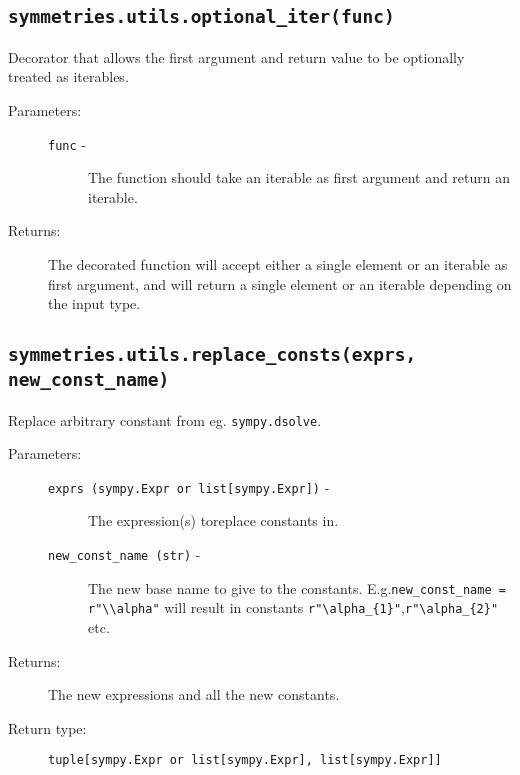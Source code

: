 \subsection*{\lstinline{symmetries.utils.optional_iter(func)}}

   Decorator that allows the first argument and return value to be
   optionally treated as iterables.

   \begin{description}
      \item[Parameters:] \leavevmode
        \begin{description}
            \item[\lstinline{func} -] The function should take an iterable as first argument and return an iterable.
        \end{description}
      \item[Returns:] The decorated function will accept either a single element or an iterable as first argument, and will return a single element or an iterable depending on the input type.
   \end{description}

\subsection*{\lstinline{symmetries.utils.replace_consts(exprs, new_const_name)}}

   Replace arbitrary constant from eg. \lstinline{sympy.dsolve}.

   \begin{description}
      \item[Parameters:] \leavevmode
        \begin{description}
            \item[\lstinline{exprs (sympy.Expr or list[sympy.Expr])} -] The expression(s) to\newline replace constants in.
            \item[\lstinline{new_const_name (str)} -] The new base name to give to the constants. E.g.\newline \lstinline{new_const_name = r"\\alpha"} will result in constants \lstinline|r"\alpha_{1}"|,\newline \lstinline|r"\alpha_{2}"| etc.
        \end{description}
      \item[Returns:] The new expressions and all the new constants.
      \item[Return type:] \lstinline{tuple[sympy.Expr or list[sympy.Expr], list[sympy.Expr]]}
   \end{description}

